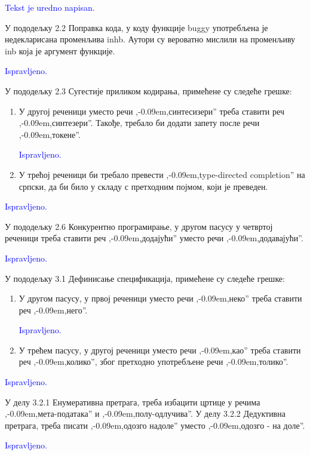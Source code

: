 \documentclass[a4paper]{report}
\newcommand{\odgovor}[1]{\textcolor{blue}{#1}}
\def\zn{,\kern-0.09em,}
\begin{document}
\odgovor{Tekst je uredno napisan.}

\par У пододељку 2.2 Поправка кода, у коду функције buggy употребљена је недекларисана променљива inhb. Аутори су вероватно мислили на променљиву inb која је аргумент функције.

\odgovor{Ispravljeno.}

\par У пододељку 2.3 Сугестије приликом кодирања, примећене су следеће грешке:
\begin{enumerate}
\item У другој реченици уместо речи \zn синтесизери'' треба ставити реч \zn синтезери''. Такође, требало би додати запету после речи \zn токене''.

\odgovor{Ispravljeno.}

\item У трећој реченици би требало превести \zn type-directed completion'' на српски, да би било у складу с претходним појмом, који је преведен.
\end{enumerate}

\odgovor{Ispravljeno.}

\par У пододељку 2.6 Конкурентно програмирање, у другом пасусу у четвртој реченици треба ставити реч \zn додајући'' уместо речи \zn додавајући''.

\odgovor{Ispravljeno.}


\par У пододељку 3.1 Дефинисање спецификација, примећене су следеће грешке:
\begin{enumerate}
\item У другом пасусу, у првој реченици уместо речи \zn неко'' треба ставити реч \zn него''.

\odgovor {Ispravljeno.}

\item У трећем пасусу, у другој реченици уместо речи \zn као'' треба ставити реч \zn колико'', због претходно употребљене речи \zn толико''.
\end{enumerate}

\odgovor {Ispravljeno.}

\par У делу 3.2.1 Енумеративна претрага, треба избацити цртице у речима \zn мета-података'' и \zn полу-одлучива''. У делу 3.2.2 Дедуктивна претрага, треба писати \zn одозго надоле'' уместо \zn одозго - на доле''.

\odgovor {Ispravljeno.}
\end{document}
